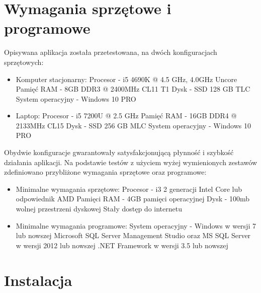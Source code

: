 \documentclass[a4paper]{book}
\begin{document}
\section{Wymagania sprzętowe i programowe}
Opisywana aplikacja została przetestowana, na dwóch konfiguracjach sprzętowych:
 \begin{itemize}
	\item Komputer stacjonarny:
	\subitem Procesor - i5 4690K @ 4.5 GHz, 4.0GHz Uncore
	\subitem Pamięć RAM - 8GB DDR3 @ 2400MHz CL11 T1
	\subitem Dysk - SSD 128 GB TLC
	\subitem System operacyjny - Windows 10 PRO
	\item Laptop:
	\subitem Procesor - i5 7200U @ 2.5 GHz
	\subitem Pamięć RAM - 16GB DDR4 @ 2133MHz CL15
	\subitem Dysk - SSD 256 GB MLC
	\subitem System operacyjny - Windows 10 PRO
\end{itemize}
Obydwie konfiguracje gwarantowały satysfakcjonującą płynność i szybkość działania aplikacji.
Na podstawie testów z użyciem wyżej wymienionych zestawów zdefiniowano przybliżone wymagania sprzętowe oraz programowe:
\begin{itemize}
	\item Minimalne wymagania sprzętowe:
	\subitem Procesor - i3 2 generacji Intel Core lub odpowiednik AMD
	\subitem Pamięci RAM - 4GB pamięci operacyjnej
	\subitem Dysk - 100mb wolnej przestrzeni dyskowej
	\subitem Stały dostęp do internetu
	\item Minimalne wymagania programowe:
	\subitem System operacyjny - Windows w wersji 7 lub nowszej
	\subitem Microsoft SQL Server Management Studio oraz MS SQL Server w wersji 2012 lub nowszej
	\subitem .NET Framework w wersji 3.5 lub nowszej
\end{itemize}
\section{Instalacja}
\end{document}
